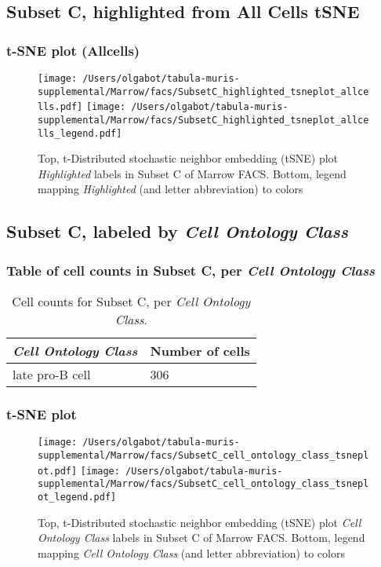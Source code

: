 \clearpage
\subsection{Subset C, highlighted from All Cells tSNE}
\subsubsection{t-SNE plot (Allcells)}
\begin{figure}[h]
\centering
\texttt{[image: /Users/olgabot/tabula-muris-supplemental/Marrow/facs/SubsetC\_highlighted\_tsneplot\_allcells.pdf]}
\texttt{[image: /Users/olgabot/tabula-muris-supplemental/Marrow/facs/SubsetC\_highlighted\_tsneplot\_allcells\_legend.pdf]}
\caption{Top, t-Distributed stochastic neighbor embedding (tSNE) plot  \emph{Highlighted} labels in Subset C of Marrow FACS. Bottom, legend mapping \emph{Highlighted} (and letter abbreviation) to colors}
\end{figure}


\clearpage

\subsection{Subset C, labeled by \emph{Cell Ontology Class}}
\subsubsection{Table of cell counts in Subset C, per \emph{Cell Ontology Class}}\begin{table}[h]
\centering
\label{my-label}
\begin{tabular}{@{}ll@{}}
\toprule

\emph{Cell Ontology Class}& Number of cells \\ \midrule
late pro-B cell & 306 \\
\bottomrule
\end{tabular}
\caption{Cell counts for Subset C, per \emph{Cell Ontology Class}.}
\end{table}

\clearpage
\subsubsection{t-SNE plot}
\begin{figure}[h]
\centering
\texttt{[image: /Users/olgabot/tabula-muris-supplemental/Marrow/facs/SubsetC\_cell\_ontology\_class\_tsneplot.pdf]}
\texttt{[image: /Users/olgabot/tabula-muris-supplemental/Marrow/facs/SubsetC\_cell\_ontology\_class\_tsneplot\_legend.pdf]}
\caption{Top, t-Distributed stochastic neighbor embedding (tSNE) plot  \emph{Cell Ontology Class} labels in Subset C of Marrow FACS. Bottom, legend mapping \emph{Cell Ontology Class} (and letter abbreviation) to colors}
\end{figure}


